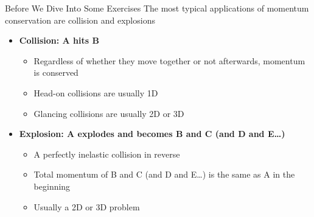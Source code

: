 \documentclass[12pt,compress,aspectratio=169]{beamer}
\begin{document}
\begin{frame}{Before We Dive Into Some Exercises}
  The most typical applications of momentum conservation are collision and
  explosions
  \begin{itemize}
  \item\textbf{Collision: A hits B}
    \begin{itemize}
    \item Regardless of whether they move together or not afterwards, momentum
      is conserved
    \item Head-on collisions are usually 1D
    \item Glancing collisions are usually 2D or 3D
    \end{itemize}
  \item\textbf{Explosion: A explodes and becomes B and C (and D and E\ldots)}
    \begin{itemize}
    \item A perfectly inelastic collision in reverse
    \item Total momentum of B and C (and D and E\ldots) is the same as A in the
      beginning
    \item Usually a 2D or 3D problem
    \end{itemize}
  \end{itemize}
\end{frame}




%
\end{document}
